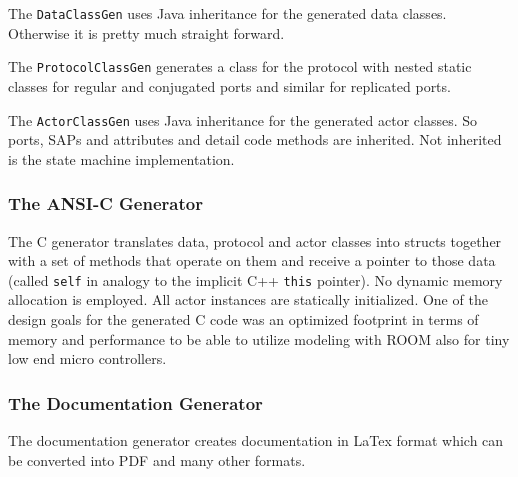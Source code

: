 The \texttt{DataClassGen} uses Java inheritance for the generated data classes. Otherwise it is pretty 
much straight forward.

The \texttt{ProtocolClassGen} generates a class for the protocol with nested static classes for regular 
and conjugated ports and similar for replicated ports.

The \texttt{ActorClassGen} uses Java inheritance for the generated actor classes. So ports, SAPs and 
attributes and detail code methods are inherited. Not inherited is the state machine implementation.

\subsubsection*{The ANSI-C Generator}

The C generator translates data, protocol and actor classes into structs together with a set of methods 
that operate on them and receive a pointer to those data (called \texttt{self} in analogy to the implicit 
C++ \texttt{this} pointer).
No dynamic memory allocation is employed. All actor instances are statically initialized.
One of the design goals for the generated C code was an optimized footprint in terms of memory and 
performance to be able to utilize modeling with ROOM also for tiny low end micro controllers.

\subsubsection*{The Documentation Generator}

The documentation generator creates documentation in LaTex format which can be converted into PDF and many 
other formats.
